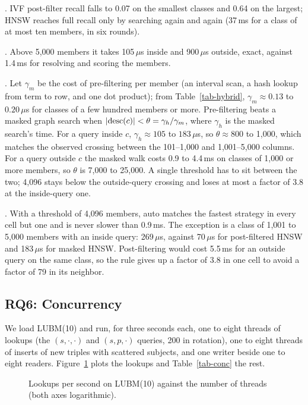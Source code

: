.
IVF post-filter recall falls to 0.07 on the smallest classes and 0.64 on the
largest; HNSW reaches full recall only by searching again and again (37\,ms
for a class of at most ten members, in six rounds).

.
Above 5,000 members it takes 105\,$\mu$s inside and 900\,$\mu$s outside,
exact, against 1.4\,ms for resolving and scoring the members.

.
Let $\gamma_m$ be the cost of pre-filtering per member (an interval scan, a hash
lookup from term to row, and one dot product); from Table~\ref{tab-hybrid},
$\gamma_m\approx 0.13$ to $0.20\,\mu$s for classes of a few hundred members or
more.
Pre-filtering beats a masked graph search when $|\mathrm{desc}(c)|<\theta=\gamma_h/\gamma_m$, where
$\gamma_h$ is the masked search's time.
For a query inside $c$, $\gamma_h\approx 105$ to $183\,\mu$s, so $\theta\approx 800$ to
1,000, which matches the observed crossing between the 101--1,000 and
1,001--5,000 columns.
For a query outside $c$ the masked walk costs 0.9 to 4.4\,ms on classes of
1,000 or more members, so $\theta$ is 7,000 to 25,000.
A single threshold has to sit between the two; 4,096 stays below the
outside-query crossing and loses at most a factor of 3.8 at the inside-query
one.

.
With a threshold of 4,096 members, auto matches the fastest strategy in every
cell but one and is never slower than 0.9\,ms.
The exception is a class of 1,001 to 5,000 members with an inside query:
269\,$\mu$s, against 70\,$\mu$s for post-filtered HNSW and 183\,$\mu$s for
masked HNSW.
Post-filtering would cost 5.5\,ms for an outside query on the same class, so
the rule gives up a factor of 3.8 in one cell to avoid a factor of 79 in its
neighbor.

\subsection{RQ6: Concurrency}

We load LUBM(10) and run, for three seconds each, one to eight threads of
lookups (the $(s,\cdot,\cdot)$ and $(s,p,\cdot)$ queries, 200 in rotation),
one to eight threads of inserts of new triples with scattered subjects, and
one writer beside one to eight readers.
Figure~\ref{fig-conc} plots the lookups and Table~\ref{tab-conc} the rest.

\begin{figure}[t]
\centering

\caption{Lookups per second on LUBM(10) against the number of threads (both axes logarithmic).}
\label{fig-conc}
\end{figure}

